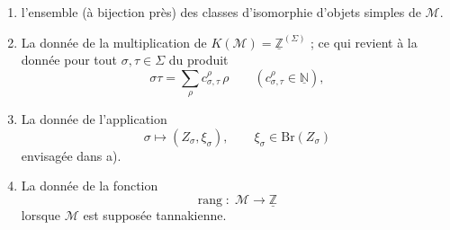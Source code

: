 \documentclass[11pt,a4paper]{article}
\begin{document}
\begin{enumerate}
\item l'ensemble (à bijection près) \add{$\Sigma$} des \struck{\ill{}} classes
d'isomorphie d'objets simples de $\mathcal{M}$.

\item La donnée de la multiplication de
$K(\mathcal{M}) = \underline{\mathbb{Z}}^{(\Sigma)}$ ; ce qui revient à la
donnée pour tout $\sigma, \tau \in \Sigma$ du produit
\[
\sigma\tau = \sum_{\rho} c^{\rho}_{\sigma,\tau}\, \rho
\qquad (c^{\rho}_{\sigma,\tau} \in \underline{\mathbb{N}}),
\]
\end{enumerate}

\begin{enumerate}
\setcounter{enumi}{2}
\item La donnée de l'application
\[
\sigma \longmapsto (Z_{\sigma}, \xi_{\sigma}) , \qquad
\xi_{\sigma} \in \mathrm{Br}(Z_{\sigma})
\]
envisagée dans a).

\item La donnée de la fonction
\[
\text{rang} \;:\; \mathcal{M} \longrightarrow \underline{\mathbb{Z}}
\]
lorsque $\mathcal{M}$ est supposée \struck{\ill{}} tannakienne.
\struck{\ill{}}
\end{enumerate}
\end{document}
